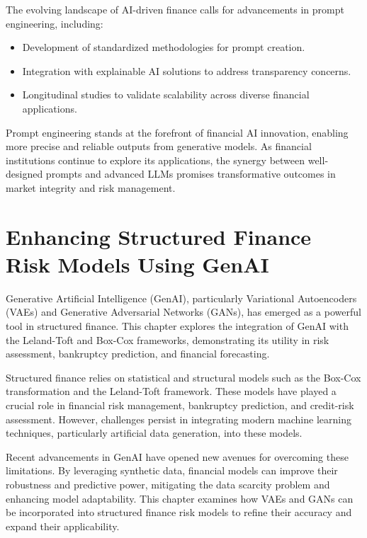 \documentclass[a4paper,headinclude=on,footinclude=on,12pt,oneside]{scrbook}
\begin{document}
	The evolving landscape of AI-driven finance calls for advancements in prompt engineering, including:
	\begin{itemize}
		\item Development of standardized methodologies for prompt creation.
		\item Integration with explainable AI solutions to address transparency concerns.
		\item Longitudinal studies to validate scalability across diverse financial applications.
	\end{itemize}
	
	Prompt engineering stands at the forefront of financial AI innovation, enabling more precise and reliable outputs from generative models. As financial institutions continue to explore its applications, the synergy between well-designed prompts and advanced LLMs promises transformative outcomes in market integrity and risk management.
	
	
	
	\chapter{Enhancing Structured Finance Risk Models Using GenAI}
	
	Generative Artificial Intelligence (GenAI), particularly Variational Autoencoders (VAEs) and Generative Adversarial Networks (GANs), has emerged as a powerful tool in structured finance. This chapter explores the integration of GenAI with the Leland-Toft and Box-Cox frameworks, demonstrating its utility in risk assessment, bankruptcy prediction, and financial forecasting.
	
	Structured finance relies on statistical and structural models such as the Box-Cox transformation and the Leland-Toft framework. These models have played a crucial role in financial risk management, bankruptcy prediction, and credit-risk assessment. However, challenges persist in integrating modern machine learning techniques, particularly artificial data generation, into these models. 
	
	Recent advancements in GenAI have opened new avenues for overcoming these limitations. By leveraging synthetic data, financial models can improve their robustness and predictive power, mitigating the data scarcity problem and enhancing model adaptability. This chapter examines how VAEs and GANs can be incorporated into structured finance risk models to refine their accuracy and expand their applicability.
	
\end{document}

